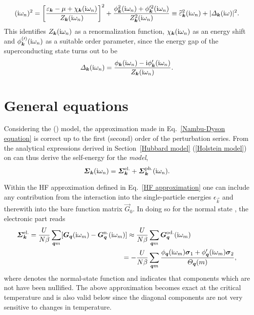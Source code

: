 %
\begin{align*}
    (\mathrm i \omega_n)^2 = \left[ \frac
        {\varepsilon_{\boldsymbol k} - \mu + \chi_{\boldsymbol k}(\mathrm i \omega_n)}
        {Z_{\boldsymbol k}(\mathrm i \omega_n)}
    \right]^2
    + \frac
        {\phi_{\boldsymbol k}^2(\mathrm i \omega_n) + \phi'^2_{\boldsymbol k}(\mathrm i \omega_n)}
        {Z_{\boldsymbol k}^2(\mathrm i \omega_n)}
    \equiv \widetilde {\varepsilon}^2_{\boldsymbol k}(\mathrm i \omega_n)
    + |\varDelta_{\boldsymbol k}(\mathrm i \omega)|^2.
\end{align*}
%
This identifies $Z_{\boldsymbol k}(\mathrm i \omega_n)$ as a renormalization function,
$\chi_{\boldsymbol k}(\mathrm i \omega_n)$ as an energy shift and $\phi^{(\prime)}_{\boldsymbol k}(\mathrm i
\omega_n)$ as a suitable order parameter, since the energy gap of the
superconducting state turns out to be
%
\begin{align*}
    \varDelta_{\boldsymbol k}(\mathrm i \omega_n) = \frac
        {\phi_{\boldsymbol k}(\mathrm i \omega_n) - \mathrm i \phi'_{\boldsymbol k}(\mathrm i \omega_n)}
        {Z_{\boldsymbol k}(\mathrm i \omega_n)}.
\end{align*}

\section{General equations}

Considering the  () model, the approximation made
in Eq.~\ref{Nambu-Dyson equation} is correct up to the first (second) order of
the perturbation series. From the analytical expressions derived in
Section~\ref{Hubbard model} (\ref{Holstein model}) on can thus derive the
self-energy for the \emph{ model},
%
\begin{equation*}
    \boldsymbol {\varSigma}_{\boldsymbol k} (\mathrm i \omega_n)
    = \boldsymbol {\varSigma}_{\boldsymbol k} \sp{\text{el.}}
    + \boldsymbol {\varSigma}_{\boldsymbol k} \sp{\text{ph.}} (\mathrm i \omega_n).
\end{equation*}

Within the HF approximation defined in Eq.~\ref{HF approximation} one can
include any contribution from the  interaction into the
single-particle energies $\epsilon_{\vec k}$ and therewith into the bare
 function matrix $\vec G_0$. In doing so for the normal state
\cite[37]{AllenMitrovic82}, the electronic part reads
%
\begin{align*}
    \boldsymbol {\varSigma}_{\boldsymbol k} \sp{\text{el.}}
    = \frac{U}{N \beta} \sum_{\boldsymbol q m}
        [ \boldsymbol G_{\boldsymbol q} (\mathrm i \omega_m)
        - \boldsymbol G_{\boldsymbol q} \sp{\text{n.}} (\mathrm i \omega_m) ]
    \approx \frac{U}{N \beta} &\sum_{\boldsymbol q m}
        \boldsymbol G_{\boldsymbol q} \sp{\text{od.}} (\mathrm i \omega_m)
    \\
    = -\frac{U}{N \beta} &\sum_{\boldsymbol q m} \frac
        { \phi _{\boldsymbol q}(\mathrm i \omega_m) \boldsymbol \sigma_1
        + \phi'_{\boldsymbol q}(\mathrm i \omega_m) \boldsymbol \sigma_2 }
        {\varTheta_{\boldsymbol q}(m)},
\end{align*}
%
where  denotes the normal-state  function and 
indicates that components which are not  have been nullified.
The above approximation becomes exact at the critical temperature and is also
valid below \cite[38]{AllenMitrovic82} since the diagonal components are not
very sensitive to changes in temperature.

